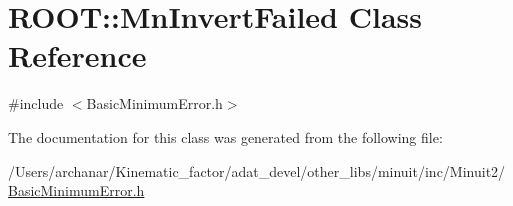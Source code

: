 \hypertarget{classROOT_1_1Minuit2_1_1BasicMinimumError_1_1MnInvertFailed}{}\section{R\+O\+OT\+:\+:Mn\+Invert\+Failed Class Reference}
\label{classROOT_1_1Minuit2_1_1BasicMinimumError_1_1MnInvertFailed}


{\ttfamily \#include $<$Basic\+Minimum\+Error.\+h$>$}



The documentation for this class was generated from the following file\+:\begin{DoxyCompactItemize}
\item 
/\+Users/archanar/\+Kinematic\+\_\+factor/adat\+\_\+devel/other\+\_\+libs/minuit/inc/\+Minuit2/\mbox{\hyperlink{other__libs_2minuit_2inc_2Minuit2_2BasicMinimumError_8h}{Basic\+Minimum\+Error.\+h}}\end{DoxyCompactItemize}

